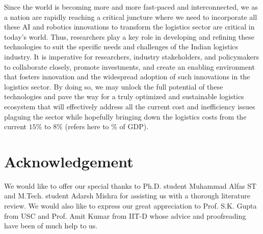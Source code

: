 \documentclass[paper=a4wide, fontsize=12pt]{scrartcl}	 %
\begin{document}
Since the world is becoming more and more fast-paced and interconnected, we as a nation are rapidly reaching a critical juncture where we need to incorporate all these AI and robotics innovations to transform the logistics sector are critical in today's world. Thus, researchers play a key role in developing and refining these technologies to suit the specific needs and challenges of the Indian logistics industry. It is imperative for researchers, industry stakeholders, and policymakers to collaborate closely, promote investments, and create an enabling environment that fosters innovation and the widespread adoption of such innovations in the logistics sector. By doing so, we may unlock the full potential of these technologies and pave the way for a truly optimized and sustainable logistics ecosystem that will effectively address all the current cost and inefficiency issues plaguing the sector while hopefully bringing down the logistics costs from the current $15\%$ to $8\%$ (refers here to $\%$ of GDP).

\section*{Acknowledgement}

We would like to offer our special thanks to Ph.D. student Muhammad Alfas ST and M.Tech. student Adarsh Mishra for assisting us with a thorough literature review. We would also like to express our great appreciation to Prof. S.K. Gupta from USC and Prof. Amit Kumar from IIT-D whose advice and proofreading have been of much help to us.

\printbibliography
\end{document}

